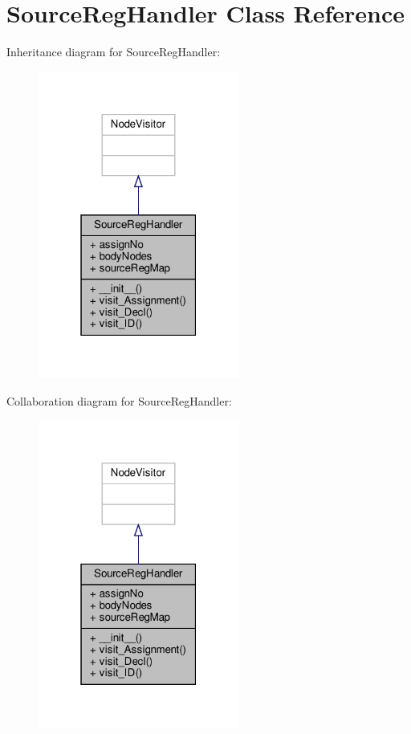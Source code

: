 \hypertarget{classPostProcessor_1_1Visitor_1_1SourceRegHandler}{}\section{Source\+Reg\+Handler Class Reference}
\label{classPostProcessor_1_1Visitor_1_1SourceRegHandler}


Inheritance diagram for Source\+Reg\+Handler\+:\nopagebreak
\begin{figure}[H]
\begin{center}
\leavevmode
\includegraphics[width=187pt]{classPostProcessor_1_1Visitor_1_1SourceRegHandler__inherit__graph}
\end{center}
\end{figure}


Collaboration diagram for Source\+Reg\+Handler\+:\nopagebreak
\begin{figure}[H]
\begin{center}
\leavevmode
\includegraphics[width=187pt]{classPostProcessor_1_1Visitor_1_1SourceRegHandler__coll__graph}
\end{center}
\end{figure}
